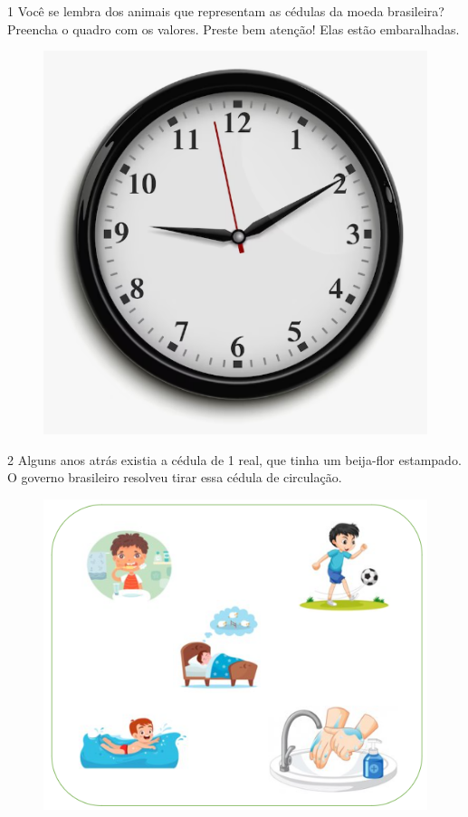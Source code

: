 
\num{1} Você se lembra dos animais que representam as cédulas da moeda
brasileira? Preencha o quadro com os valores. Preste bem atenção!
Elas estão embaralhadas.

\begin{figure}[htpb!]
\centering
\includegraphics[width=.7\textwidth]{./media/image63.png}
\end{figure}


\pagebreak
\num{2} Alguns anos atrás existia a cédula de 1 real, que tinha um beija-flor
estampado. O governo brasileiro resolveu tirar essa cédula de circulação.


\begin{figure}[htpb!]
\centering
\includegraphics[width=.4\textwidth]{./media/image64.png}
\end{figure}

